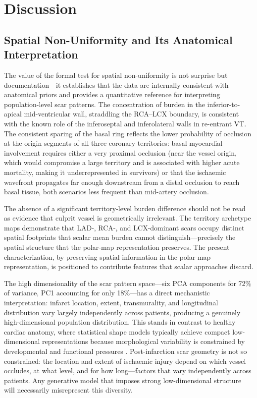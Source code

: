 \chapter{Discussion}

\section{Spatial Non-Uniformity and Its Anatomical Interpretation}

The value of the formal test for spatial non-uniformity is not surprise but
documentation---it establishes that the data are internally consistent with anatomical priors
and provides a quantitative reference for interpreting population-level scar patterns.
The concentration of burden in the inferior-to-apical
mid-ventricular wall, straddling the RCA--LCX boundary, is consistent with
the known role of the inferoseptal and inferolateral walls in re-entrant VT. The consistent sparing of the basal ring reflects the lower probability of occlusion at the
origin segments of all three coronary territories: basal myocardial involvement requires
either a very proximal occlusion (near the vessel origin, which would compromise a large
territory and is associated with higher acute mortality, making it underrepresented in
survivors) or that the ischaemic wavefront propagates far enough downstream from a distal
occlusion to reach basal tissue, both scenarios less frequent than mid-artery occlusion.

The absence of a significant territory-level burden difference should not be read as evidence
that culprit vessel is geometrically irrelevant. The territory archetype maps demonstrate that
LAD-, RCA-, and LCX-dominant scars occupy distinct spatial footprints that scalar mean
burden cannot distinguish---precisely the spatial structure that the polar-map representation
preserves.
The present characterization, by preserving spatial information in the polar-map
representation, is positioned to contribute features that scalar approaches discard.

The high dimensionality of the scar pattern space---six PCA components for 72\% of
variance, PC1 accounting for only 18\%---has a direct mechanistic interpretation: infarct
location, extent, transmurality, and longitudinal distribution vary largely independently across
patients, producing a genuinely high-dimensional population distribution. This stands in
contrast to healthy cardiac anatomy, where statistical shape models typically achieve
compact low-dimensional representations because morphological variability is constrained
by developmental and functional pressures \cite{rodero2021}. Post-infarction scar
geometry is not so constrained: the location and extent of ischaemic injury depend on which
vessel occludes, at what level, and for how long---factors that vary independently across
patients. Any generative model that imposes strong low-dimensional structure will
necessarily misrepresent this diversity.


